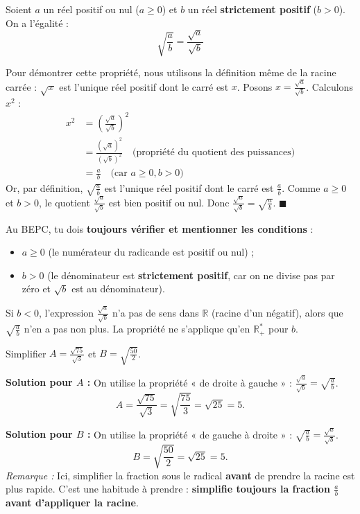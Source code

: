 \documentclass[11pt]{article}
\begin{document}
\begin{propriete}
Soient $a$ un réel positif ou nul ($a \ge 0$) et $b$ un réel \textbf{strictement positif} ($b > 0$).
On a l'égalité :
\[
\sqrt{\frac{a}{b}} = \frac{\sqrt{a}}{\sqrt{b}}
\]
\end{propriete}

\begin{experience}
Pour démontrer cette propriété, nous utilisons la définition même de la racine carrée : $\sqrt{x}$ est l'unique réel positif dont le carré est $x$.
Posons $x = \frac{\sqrt{a}}{\sqrt{b}}$. Calculons $x^2$ :
\begin{align*}
x^2 &= \left( \frac{\sqrt{a}}{\sqrt{b}} \right)^2 \\
    &= \frac{(\sqrt{a})^2}{(\sqrt{b})^2} \quad \text{(propriété du quotient des puissances)} \\
    &= \frac{a}{b} \quad \text{(car $a\ge 0, b>0$)}
\end{align*}
Or, par définition, $\sqrt{\frac{a}{b}}$ est l'unique réel positif dont le carré est $\frac{a}{b}$.
Comme $a \ge 0$ et $b > 0$, le quotient $\frac{\sqrt{a}}{\sqrt{b}}$ est bien positif ou nul.
Donc $\frac{\sqrt{a}}{\sqrt{b}} = \sqrt{\frac{a}{b}}$. \hfill $\blacksquare$
\end{experience}

\begin{attention}
Au BEPC, tu dois \textbf{toujours vérifier et mentionner les conditions} :
\begin{itemize}
    \item $a \ge 0$ (le numérateur du radicande est positif ou nul) ;
    \item $b > 0$ (le dénominateur est \textbf{strictement positif}, car on ne divise pas par zéro et $\sqrt{b}$ est au dénominateur).
\end{itemize}
Si $b < 0$, l'expression $\frac{\sqrt{a}}{\sqrt{b}}$ n'a pas de sens dans $\mathbb{R}$ (racine d'un négatif), alors que $\sqrt{\frac{a}{b}}$ n'en a pas non plus. La propriété ne s'applique qu'en $\mathbb{R}_+^*$ pour $b$.
\end{attention}

\begin{exemplebox}
Simplifier $A = \frac{\sqrt{75}}{\sqrt{3}}$ et $B = \sqrt{\frac{50}{2}}$.

\textbf{Solution pour $A$ :}
On utilise la propriété « de droite à gauche » : $\frac{\sqrt{a}}{\sqrt{b}} = \sqrt{\frac{a}{b}}$.
\[
A = \frac{\sqrt{75}}{\sqrt{3}} = \sqrt{\frac{75}{3}} = \sqrt{25} = 5.
\]

\textbf{Solution pour $B$ :}
On utilise la propriété « de gauche à droite » : $\sqrt{\frac{a}{b}} = \frac{\sqrt{a}}{\sqrt{b}}$.
\[
B = \sqrt{\frac{50}{2}} = \sqrt{25} = 5.
\]
\textit{Remarque :} Ici, simplifier la fraction sous le radical \textbf{avant} de prendre la racine est plus rapide. C'est une habitude à prendre : \textbf{simplifie toujours la fraction $\frac{a}{b}$ avant d'appliquer la racine}.
\end{exemplebox}
\end{document}
